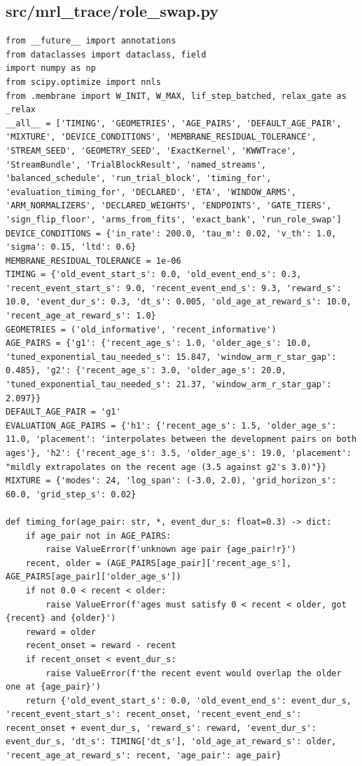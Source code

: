 \documentclass[a4paper,10pt]{article}
\begin{document}
\subsection{src/mrl\_trace/role\_swap.py}
\begin{Verbatim}
from __future__ import annotations
from dataclasses import dataclass, field
import numpy as np
from scipy.optimize import nnls
from .membrane import W_INIT, W_MAX, lif_step_batched, relax_gate as _relax
__all__ = ['TIMING', 'GEOMETRIES', 'AGE_PAIRS', 'DEFAULT_AGE_PAIR', 'MIXTURE', 'DEVICE_CONDITIONS', 'MEMBRANE_RESIDUAL_TOLERANCE', 'STREAM_SEED', 'GEOMETRY_SEED', 'ExactKernel', 'KWWTrace', 'StreamBundle', 'TrialBlockResult', 'named_streams', 'balanced_schedule', 'run_trial_block', 'timing_for', 'evaluation_timing_for', 'DECLARED', 'ETA', 'WINDOW_ARMS', 'ARM_NORMALIZERS', 'DECLARED_WEIGHTS', 'ENDPOINTS', 'GATE_TIERS', 'sign_flip_floor', 'arms_from_fits', 'exact_bank', 'run_role_swap']
DEVICE_CONDITIONS = {'in_rate': 200.0, 'tau_m': 0.02, 'v_th': 1.0, 'sigma': 0.15, 'ltd': 0.6}
MEMBRANE_RESIDUAL_TOLERANCE = 1e-06
TIMING = {'old_event_start_s': 0.0, 'old_event_end_s': 0.3, 'recent_event_start_s': 9.0, 'recent_event_end_s': 9.3, 'reward_s': 10.0, 'event_dur_s': 0.3, 'dt_s': 0.005, 'old_age_at_reward_s': 10.0, 'recent_age_at_reward_s': 1.0}
GEOMETRIES = ('old_informative', 'recent_informative')
AGE_PAIRS = {'g1': {'recent_age_s': 1.0, 'older_age_s': 10.0, 'tuned_exponential_tau_needed_s': 15.847, 'window_arm_r_star_gap': 0.485}, 'g2': {'recent_age_s': 3.0, 'older_age_s': 20.0, 'tuned_exponential_tau_needed_s': 21.37, 'window_arm_r_star_gap': 2.097}}
DEFAULT_AGE_PAIR = 'g1'
EVALUATION_AGE_PAIRS = {'h1': {'recent_age_s': 1.5, 'older_age_s': 11.0, 'placement': 'interpolates between the development pairs on both ages'}, 'h2': {'recent_age_s': 3.5, 'older_age_s': 19.0, 'placement': "mildly extrapolates on the recent age (3.5 against g2's 3.0)"}}
MIXTURE = {'modes': 24, 'log_span': (-3.0, 2.0), 'grid_horizon_s': 60.0, 'grid_step_s': 0.02}

def timing_for(age_pair: str, *, event_dur_s: float=0.3) -> dict:
    if age_pair not in AGE_PAIRS:
        raise ValueError(f'unknown age pair {age_pair!r}')
    recent, older = (AGE_PAIRS[age_pair]['recent_age_s'], AGE_PAIRS[age_pair]['older_age_s'])
    if not 0.0 < recent < older:
        raise ValueError(f'ages must satisfy 0 < recent < older, got {recent} and {older}')
    reward = older
    recent_onset = reward - recent
    if recent_onset < event_dur_s:
        raise ValueError(f'the recent event would overlap the older one at {age_pair}')
    return {'old_event_start_s': 0.0, 'old_event_end_s': event_dur_s, 'recent_event_start_s': recent_onset, 'recent_event_end_s': recent_onset + event_dur_s, 'reward_s': reward, 'event_dur_s': event_dur_s, 'dt_s': TIMING['dt_s'], 'old_age_at_reward_s': older, 'recent_age_at_reward_s': recent, 'age_pair': age_pair}


\end{Verbatim}
\end{document}
